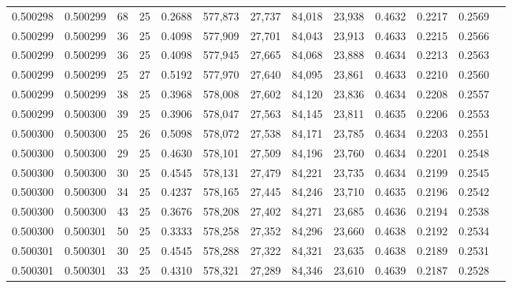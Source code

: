 \begin{tabular}{rrrrrrrrrrrrr}
0.500298 & 0.500299 &    68 &  25 &                                     0.2688 & 577,873 &  27,737 &  84,018 &  23,938 & 0.4632 & 0.2217 & 0.2569 \\
0.500299 & 0.500299 &    36 &  25 &                                     0.4098 & 577,909 &  27,701 &  84,043 &  23,913 & 0.4633 & 0.2215 & 0.2566 \\
0.500299 & 0.500299 &    36 &  25 &                                     0.4098 & 577,945 &  27,665 &  84,068 &  23,888 & 0.4634 & 0.2213 & 0.2563 \\
0.500299 & 0.500299 &    25 &  27 &                                     0.5192 & 577,970 &  27,640 &  84,095 &  23,861 & 0.4633 & 0.2210 & 0.2560 \\
0.500299 & 0.500299 &    38 &  25 &                                     0.3968 & 578,008 &  27,602 &  84,120 &  23,836 & 0.4634 & 0.2208 & 0.2557 \\
0.500299 & 0.500300 &    39 &  25 &                                     0.3906 & 578,047 &  27,563 &  84,145 &  23,811 & 0.4635 & 0.2206 & 0.2553 \\
0.500300 & 0.500300 &    25 &  26 &                                     0.5098 & 578,072 &  27,538 &  84,171 &  23,785 & 0.4634 & 0.2203 & 0.2551 \\
0.500300 & 0.500300 &    29 &  25 &                                     0.4630 & 578,101 &  27,509 &  84,196 &  23,760 & 0.4634 & 0.2201 & 0.2548 \\
0.500300 & 0.500300 &    30 &  25 &                                     0.4545 & 578,131 &  27,479 &  84,221 &  23,735 & 0.4634 & 0.2199 & 0.2545 \\
0.500300 & 0.500300 &    34 &  25 &                                     0.4237 & 578,165 &  27,445 &  84,246 &  23,710 & 0.4635 & 0.2196 & 0.2542 \\
0.500300 & 0.500300 &    43 &  25 &                                     0.3676 & 578,208 &  27,402 &  84,271 &  23,685 & 0.4636 & 0.2194 & 0.2538 \\
0.500300 & 0.500301 &    50 &  25 &                                     0.3333 & 578,258 &  27,352 &  84,296 &  23,660 & 0.4638 & 0.2192 & 0.2534 \\
0.500301 & 0.500301 &    30 &  25 &                                     0.4545 & 578,288 &  27,322 &  84,321 &  23,635 & 0.4638 & 0.2189 & 0.2531 \\
0.500301 & 0.500301 &    33 &  25 &                                     0.4310 & 578,321 &  27,289 &  84,346 &  23,610 & 0.4639 & 0.2187 & 0.2528 \\

\end{tabular}
